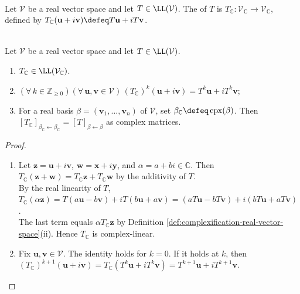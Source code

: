 \begin{definition} \label{def:complexification-real-operator} \\
Let $\mathcal{V}$ be a real vector space and let $T\in\LL(\mathcal{V})$. The  of $T$ is $T_{\mathbb{C}}:\mathcal{V}_{\mathbb{C}}\to\mathcal{V}_{\mathbb{C}}$, defined by $T_{\mathbb{C}}(\mathbf{u}+i\mathbf{v})\defeq T\mathbf{u}+iT\mathbf{v}$.
\end{definition}

\begin{proposition} \label{prop:complexification-operator-basic-properties} \\
Let $\mathcal{V}$ be a real vector space and let $T\in\LL(\mathcal{V})$.
\begin{enumerate}[label=(\roman*)]
\setlength{\itemsep}{0pt}
\item $T_{\mathbb{C}}\in\LL(\mathcal{V}_{\mathbb{C}})$.
\item $(\forall\,k\in\mathbb{Z}_{\geq0})(\forall\,\mathbf{u},\mathbf{v}\in\mathcal{V})\,(T_{\mathbb{C}})^k(\mathbf{u}+i\mathbf{v})=T^k\mathbf{u}+iT^k\mathbf{v}$;
\item For a real basis $\beta=(\mathbf{v}_1,\ldots,\mathbf{v}_n)$ of $\mathcal{V}$, set $\beta_{\mathbb{C}}\defeq\operatorname{cpx}(\beta)$. Then $[T_{\mathbb{C}}]_{\beta_{\mathbb{C}}\leftarrow\beta_{\mathbb{C}}}=[T]_{\beta\leftarrow\beta}$ as complex matrices.
\end{enumerate}
\begin{proof}
\begin{enumerate}[label=(\roman*)]
\setlength{\itemsep}{0pt}
\item Let $\mathbf{z}=\mathbf{u}+i\mathbf{v}$, $\mathbf{w}=\mathbf{x}+i\mathbf{y}$, and $\alpha=a+bi\in\mathbb{C}$. Then $T_{\mathbb{C}}(\mathbf{z}+\mathbf{w})=T_{\mathbb{C}}\mathbf{z}+T_{\mathbb{C}}\mathbf{w}$ by the additivity of $T$.\\
By the real linearity of $T$, $T_{\mathbb{C}}(\alpha\mathbf{z})=T(a\mathbf{u}-b\mathbf{v})+iT(b\mathbf{u}+a\mathbf{v})=(aT\mathbf{u}-bT\mathbf{v})+i(bT\mathbf{u}+aT\mathbf{v})$.\\
The last term equals $\alpha T_{\mathbb{C}}\mathbf{z}$ by Definition \ref{def:complexification-real-vector-space}(ii). Hence $T_{\mathbb{C}}$ is complex-linear.
\item Fix $\mathbf{u},\mathbf{v}\in\mathcal{V}$. The identity holds for $k=0$. If it holds at $k$, then $(T_{\mathbb{C}})^{k+1}(\mathbf{u}+i\mathbf{v})=T_{\mathbb{C}}(T^k\mathbf{u}+iT^k\mathbf{v})=T^{k+1}\mathbf{u}+iT^{k+1}\mathbf{v}$.\\

\end{enumerate}
\end{proof}
\end{proposition}
